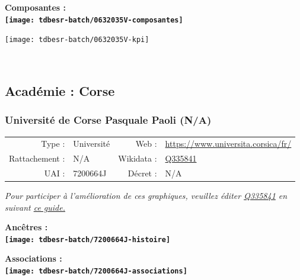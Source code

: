 \documentclass[12pt,french,]{article}
\begin{document}
\hrulefill

\begin{center} \bf Composantes : \\  
\texttt{[image: tdbesr-batch/0632035V-composantes]} \end{center}

\begin{center}\texttt{[image: tdbesr-batch/0632035V-kpi]} \end{center}\checkoddpage

\ifoddpage ~\newpage \fi   

\hypertarget{acaduxe9mie-corse}{%
\subsection{Académie : Corse}\label{acaduxe9mie-corse}}

\hypertarget{universituxe9-de-corse-pasquale-paoli-na}{%
\subsubsection{Université de Corse Pasquale Paoli
(N/A)}\label{universituxe9-de-corse-pasquale-paoli-na}}

\begin{tabular*}{\textwidth}{rp{5cm}rl}  
\hline  
Type : & Université & Web : &\href{https://www.universita.corsica/fr/}{https://www.universita.corsica/fr/} \\  
Rattachement : & N/A & Wikidata : & \href{https://www.wikidata.org/entity/Q335841}{Q335841} \\  
UAI : & 7200664J & Décret : & N/A \\  
\hline  
\end{tabular*}

\textit{\scriptsize Pour participer à l'amélioration de ces graphiques, veuillez éditer  \href{https://www.wikidata.org/entity/Q335841}{Q335841}  en suivant \href{https://github.com/cpesr/wikidataESR/blob/master/Rmd/wikidataESR.md}{ce guide.}}

\vspace{1cm}  
\begin{minipage}[b]{0.50\textwidth}\begin{center} \bf Ancêtres : \\  
\texttt{[image: tdbesr-batch/7200664J-histoire]} \end{center}\end{minipage}\begin{minipage}[b]{0.50\textwidth}\begin{center} \bf Associations : \\  
\texttt{[image: tdbesr-batch/7200664J-associations]} \end{center}\end{minipage}
\end{document}
